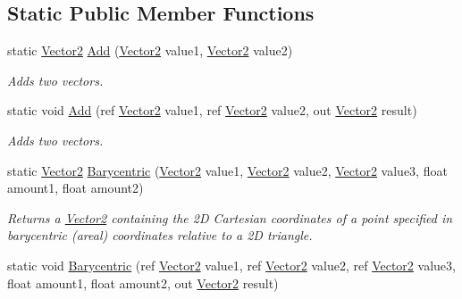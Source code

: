 \subsection*{Static Public Member Functions}
\begin{DoxyCompactItemize}
\item 
static \hyperlink{structMicrosoft_1_1Xna_1_1Framework_1_1Vector2}{Vector2} \hyperlink{structMicrosoft_1_1Xna_1_1Framework_1_1Vector2_ae2990a556175474e7dc37a807f01d9b6}{Add} (\hyperlink{structMicrosoft_1_1Xna_1_1Framework_1_1Vector2}{Vector2} value1, \hyperlink{structMicrosoft_1_1Xna_1_1Framework_1_1Vector2}{Vector2} value2)
\begin{DoxyCompactList}\small\item\em Adds two vectors.\end{DoxyCompactList}\item 
static void \hyperlink{structMicrosoft_1_1Xna_1_1Framework_1_1Vector2_a7e01f4b4c2a8fa8bc1ad7b3f0bc58fac}{Add} (ref \hyperlink{structMicrosoft_1_1Xna_1_1Framework_1_1Vector2}{Vector2} value1, ref \hyperlink{structMicrosoft_1_1Xna_1_1Framework_1_1Vector2}{Vector2} value2, out \hyperlink{structMicrosoft_1_1Xna_1_1Framework_1_1Vector2}{Vector2} result)
\begin{DoxyCompactList}\small\item\em Adds two vectors.\end{DoxyCompactList}\item 
static \hyperlink{structMicrosoft_1_1Xna_1_1Framework_1_1Vector2}{Vector2} \hyperlink{structMicrosoft_1_1Xna_1_1Framework_1_1Vector2_a219a639c30de3421cd5d69312adfdd0e}{Barycentric} (\hyperlink{structMicrosoft_1_1Xna_1_1Framework_1_1Vector2}{Vector2} value1, \hyperlink{structMicrosoft_1_1Xna_1_1Framework_1_1Vector2}{Vector2} value2, \hyperlink{structMicrosoft_1_1Xna_1_1Framework_1_1Vector2}{Vector2} value3, float amount1, float amount2)
\begin{DoxyCompactList}\small\item\em Returns a \hyperlink{structMicrosoft_1_1Xna_1_1Framework_1_1Vector2}{Vector2} containing the 2\+D Cartesian coordinates of a point specified in barycentric (areal) coordinates relative to a 2\+D triangle.\end{DoxyCompactList}\item 
static void \hyperlink{structMicrosoft_1_1Xna_1_1Framework_1_1Vector2_a52a98c2a3e22af050ddad253d40eddc3}{Barycentric} (ref \hyperlink{structMicrosoft_1_1Xna_1_1Framework_1_1Vector2}{Vector2} value1, ref \hyperlink{structMicrosoft_1_1Xna_1_1Framework_1_1Vector2}{Vector2} value2, ref \hyperlink{structMicrosoft_1_1Xna_1_1Framework_1_1Vector2}{Vector2} value3, float amount1, float amount2, out \hyperlink{structMicrosoft_1_1Xna_1_1Framework_1_1Vector2}{Vector2} result)

\end{DoxyCompactItemize}
